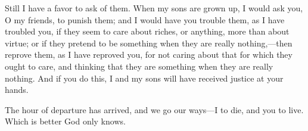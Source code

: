\documentclass[12pt]{article}
\begin{document}
Still I have a favor to ask of them. When my sons are grown up, I
would ask you, O my friends, to punish them; and I would have you
trouble them, as I have troubled you, if they seem to care about riches,
or anything, more than about virtue; or if they pretend to be something
when they are really nothing,---then reprove them, as I have reproved
you, for not caring about that for which they ought to care, and thinking
that they are something when they are really nothing. And if you do
this, I and my sons will have received justice at your hands.

The hour of departure has arrived, and we go our ways---I to die,
and you to live. Which is better God only knows.
\end{document}

